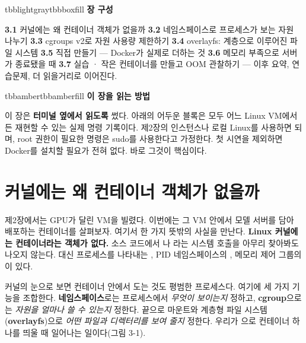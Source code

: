 \vspace{5.0pt}

\begin{calloutbox}{tbblightgray}{tbbboxfill}
{\normalsize\bfseries\color{tbbink}장 구성}\par\vspace{3pt}
\textbf{3.1} 커널에는 왜 컨테이너 객체가 없을까    \textbf{3.2} 네임스페이스로 프로세스가 보는 자원 나누기    \textbf{3.3} cgroups v2로 자원 사용량 제한하기    \textbf{3.4} overlayfs: 계층으로 이루어진 파일 시스템    \textbf{3.5} 직접 만들기 — Docker가 실제로 더하는 것    \textbf{3.6} 메모리 부족으로 서버가 종료됐을 때    \textbf{3.7} 실습 · 작은 컨테이너를 만들고 OOM 관찰하기 — 이후 요약, 연습문제, 더 읽을거리로 이어진다.
\end{calloutbox}

\vspace{3.0pt}

\begin{calloutbox}{tbbamber}{tbbamberfill}
{\normalsize\bfseries\color{tbbamberdark}이 장을 읽는 방법}\par\vspace{3pt}
이 장은 \textbf{터미널 옆에서 읽도록} 썼다. 아래의 어두운 블록은 모두 어느 Linux VM에서든 재현할 수 있는 실제 명령 기록이다. 제2장의 인스턴스나 로컬 Linux를 사용하면 되며, root 권한이 필요한 명령은 sudo를 사용한다고 가정한다. 첫 시연을 제외하면 Docker를 설치할 필요가 전혀 없다. 바로 그것이 핵심이다.
\end{calloutbox}

\section{커널에는 왜 컨테이너 객체가 없을까}

제2장에서는 GPU가 달린 VM을 빌렸다. 이번에는 그 VM 안에서 모델 서버를 담아 배포하는 컨테이너를 살펴보자. 여기서 한 가지 뜻밖의 사실을 만난다. \textbf{Linux 커널에는 컨테이너라는 객체가 없다.} 소스 코드에서 나 라는 시스템 호출을 아무리 찾아봐도 나오지 않는다. 대신 프로세스를 나타내는 , PID 네임스페이스의 , 메모리 제어 그룹의 이 있다.

커널의 눈으로 보면 컨테이너 안에서 도는 것도 평범한 프로세스다. 여기에 세 가지 기능을 조합한다. \textbf{네임스페이스}로는 프로세스에서 \textit{무엇이 보이는지} 정하고, \textbf{cgroup}으로는 \textit{자원을 얼마나 쓸 수 있는지} 정한다. 끝으로 마운트와 계층형 파일 시스템(\textbf{overlayfs})으로 \textit{어떤 파일과 디렉터리를 보여 줄지} 정한다. 우리가 으로 컨테이너 하나를 띄울 때 일어나는 일이다(그림 3-1).

